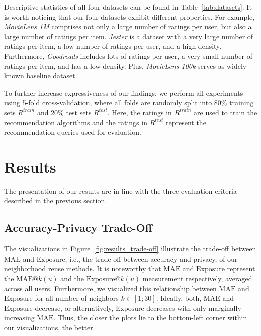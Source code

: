 \documentclass[manuscript,review,anonymous]{acmart}
\begin{document}
Descriptive statistics of all four datasets can be found in Table~\ref{tab:datasets}.
It is worth noticing that our four datasets exhibit different properties.
For example, \emph{MovieLens 1M} comprises not only a large number of ratings per user, but also a large number of ratings per item.
\emph{Jester} is a dataset with a very large number of ratings per item, a low number of ratings per user, and a high density.
Furthermore, \emph{Goodreads} includes lots of ratings per user, a very small number of ratings per item, and has a low density.
Plus, \emph{MovieLens 100k} serves as widely-known baseline dataset.

To further increase expressiveness of our findings, we perform all experiments using 5-fold cross-validation, where all folds are randomly split into 80\% training sets $R^{train}$ and 20\% test sets $R^{test}$. Here, the ratings in $R^{train}$ are used to train the recommendation algorithms and the ratings in $R^{test}$ represent the recommendation queries used for evaluation.

\section{Results}
The presentation of our results are in line with the three evaluation criteria described in the previous section.

\subsection{Accuracy-Privacy Trade-Off}
The visualizations in Figure~\ref{fig:results_trade-off} illustrate the trade-off between $\mathrm{MAE}$ and $\mathrm{Exposure}$, i.e., the trade-off between accuracy and privacy, of our neighborhood reuse methods.
It is noteworthy that $\mathrm{MAE}$ and $\mathrm{Exposure}$ represent the $\mathrm{MAE}@k(u)$ and the $\mathrm{Exposure}@k(u)$ measurement respectively, averaged across all users. 
Furthermore, we visualized this relationship between $\mathrm{MAE}$ and $\mathrm{Exposure}$ for all number of neighbors $k \in [1; 30]$.
Ideally, both, $\mathrm{MAE}$ and $\mathrm{Exposure}$ decrease, or alternatively, $\mathrm{Exposure}$ decreases with only marginally increasing $\mathrm{MAE}$.
Thus, the closer the plots lie to the bottom-left corner within our visualizations, the better.
\end{document}
